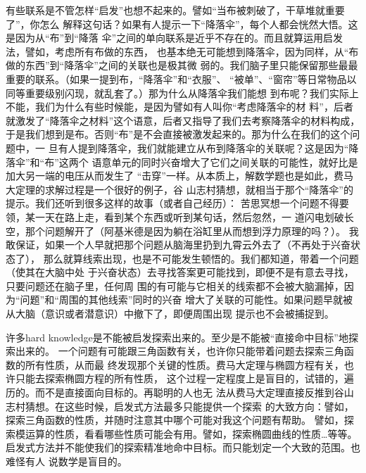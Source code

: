 \documentclass[11pt]{article}
\begin{document}
\begin{itemize}
有些联系是不管怎样“启发”也想不起来的。譬如“当布被刺破了，干草堆就重要了”，你怎么
解释这句话？如果有人提示一下“降落伞”，每个人都会恍然大悟。这是因为从“布”到“降落
伞”之间的单向联系是近乎不存在的。而且就算运用启发法，譬如，考虑所有布做的东西，
也基本绝无可能想到降落伞，因为同样，从“布做的东西”到“降落伞”之间的关联也是极其微
弱的。我们脑子里只能保留那些最最重要的联系。（如果一提到布，“降落伞”和“衣服”、
“被单”、“窗帘”等日常物品以同等重要级别闪现，就乱套了。）那为什么从降落伞我们能想
到布呢？我们实际上不能，我们为什么有些时候能，是因为譬如有人叫你“考虑降落伞的材
料”，后者就激发了“降落伞之材料”这个语意，后者又指导了我们去考察降落伞的材料构成，
于是我们想到是布。否则“布”是不会直接被激发起来的。那为什么在我们的这个问题中，一
旦有人提到降落伞，我们就能建立从布到降落伞的关联呢？这是因为“降落伞”和“布”这两个
语意单元的同时兴奋增大了它们之间关联的可能性，就好比是加大另一端的电压从而发生了
“击穿”一样。从本质上，解数学题也是如此，费马大定理的求解过程是一个很好的例子，谷
山志村猜想，就相当于那个“降落伞”的提示。我们还听到很多这样的故事（或者自己经历）：
苦思冥想一个问题不得要领，某一天在路上走，看到某个东西或听到某句话，然后忽然，一
道闪电划破长空，那个问题解开了（阿基米德是因为躺在浴缸里从而想到浮力原理的吗？）。
我敢保证，如果一个人早就把那个问题从脑海里扔到九霄云外去了（不再处于兴奋状态了），
那么就算线索出现，也是不可能发生顿悟的。我们都知道，带着一个问题（使其在大脑中处
于兴奋状态）去寻找答案更可能找到，即便不是有意去寻找，只要问题还在脑子里，任何周
围的有可能与它相关的线索都不会被大脑漏掉，因为“问题”和“周围的其他线索”同时的兴奋
增大了关联的可能性。如果问题早就被从大脑（意识或者潜意识）中撤下了，即便周围出现
提示也不会被捕捉到。

许多hard knowledge是不能被启发探索出来的。至少是不能被“直接命中目标”地探索出来的。
一个问题有可能跟三角函数有关，也许你只能带着问题去探索三角函数的所有性质，从而最
终发现那个关键的性质。费马大定理与椭圆方程有关，也许只能去探索椭圆方程的所有性质，
这个过程一定程度上是盲目的，试错的，遍历的。而不是直接面向目标的。再聪明的人也无
法从费马大定理直接反推到谷山志村猜想。在这些时候，启发式方法最多只能提供一个探索
的大致方向：譬如，探索三角函数的性质，并随时注意其中哪个可能对我这个问题有帮助。
譬如，探索模运算的性质，看看哪些性质可能会有用。譬如，探索椭圆曲线的性质…等等。
启发式方法并不能使我们的探索精准地命中目标。而只能划定一个大致的范围。也难怪有人
说数学是盲目的。


\end{itemize}
\end{document}
